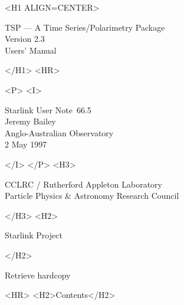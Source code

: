 \documentclass[11pt,twoside]{article}
\newcommand{\stardoccategory}  {Starlink User Note}
\newcommand{\stardocnumber}    {66.5}
\newcommand{\stardocauthors}   {Jeremy Bailey\\
                                Anglo-Australian Observatory}
\newcommand{\stardocdate}      {2 May 1997}
\newcommand{\stardocversion}   {Version 2.3}
\newcommand{\stardocmanual}    {Users' Manual}
\newcommand{\stardoctitle}     {TSP --- A Time Series/Polarimetry Package}
\newcommand{\htmladdnormallink}[2]{#1}
\newcommand{\htmladdimg}[1]{}
\newcommand{\htmlref}[2]{#1}
\newcommand{\htmladdtonavigation}[1]{}
\newcommand{\xlabel}[1]{}
\renewcommand{\_}{\texttt{\symbol{95}}}
\begin{document}
\begin{htmlonly}
   \xlabel{}
   \begin{rawhtml} <H1 ALIGN=CENTER> \end{rawhtml}
      \stardoctitle\\
      \stardocversion\\
      \stardocmanual
   \begin{rawhtml} </H1> <HR> \end{rawhtml}


   \begin{rawhtml} <P> <I> \end{rawhtml}
   \stardoccategory\ \stardocnumber \\
   \stardocauthors \\
   \stardocdate
   \begin{rawhtml} </I> </P> <H3> \end{rawhtml}
      \htmladdnormallink{CCLRC}{http://www.cclrc.ac.uk} /
      \htmladdnormallink{Rutherford Appleton Laboratory}
                        {http://www.cclrc.ac.uk/ral} \\
      \htmladdnormallink{Particle Physics \& Astronomy Research Council}
                        {http://www.pparc.ac.uk} \\
   \begin{rawhtml} </H3> <H2> \end{rawhtml}
      \htmladdnormallink{Starlink Project}{http://www.starlink.ac.uk/}
   \begin{rawhtml} </H2> \end{rawhtml}
   \htmladdnormallink{\htmladdimg{source.gif} Retrieve hardcopy}
      {http://www.starlink.ac.uk/cgi-bin/hcserver?\stardocsource}\\

  \label{stardoccontents}
  \begin{rawhtml}
    <HR>
    <H2>Contents</H2>
  \end{rawhtml}
  \htmladdtonavigation{\htmlref{\htmladdimg{contents_motif.gif}}
        {stardoccontents}}

\end{htmlonly}
\end{document}
